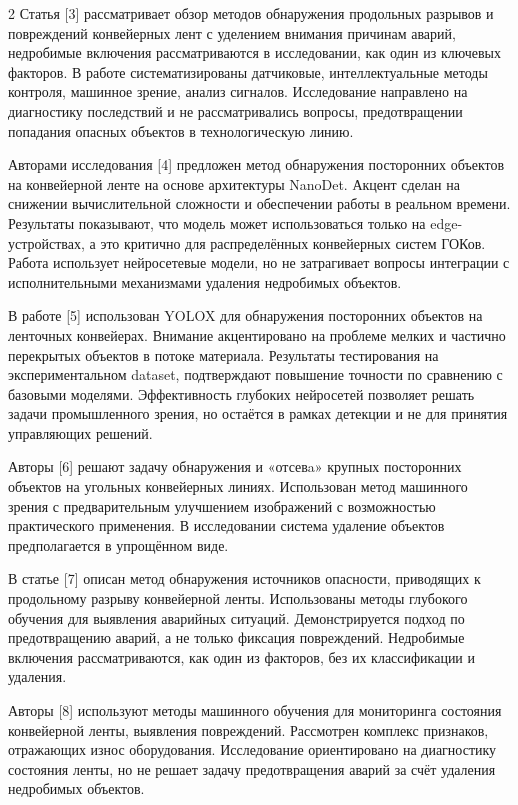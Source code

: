 \begin{multicols}{2}
Статья {[}3{]} рассматривает обзор методов обнаружения продольных
разрывов и повреждений конвейерных лент с уделением внимания причинам
аварий, недробимые включения рассматриваются в исследовании, как один из
ключевых факторов. В работе систематизированы датчиковые,
интеллектуальные методы контроля, машинное зрение, анализ сигналов.
Исследование направлено на диагностику последствий и не рассматривались
вопросы, предотвращении попадания опасных объектов в технологическую
линию.

Авторами исследования {[}4{]} предложен метод обнаружения посторонних
объектов на конвейерной ленте на основе архитектуры NanoDet. Акцент
сделан на снижении вычислительной сложности и обеспечении работы в
реальном времени. Результаты показывают, что модель может использоваться
только на edge-устройствах, а это критично для распределённых
конвейерных систем ГОКов. Работа использует нейросетевые модели, но не
затрагивает вопросы интеграции с исполнительными механизмами удаления
недробимых объектов.

В работе {[}5{]} использован YOLOX для обнаружения посторонних объектов
на ленточных конвейерах. Внимание акцентировано на проблеме мелких и
частично перекрытых объектов в потоке материала. Результаты тестирования
на экспериментальном dataset, подтверждают повышение точности по
сравнению с базовыми моделями. Эффективность глубоких нейросетей
позволяет решать задачи промышленного зрения, но остаётся в рамках
детекции и не для принятия управляющих решений.

Авторы {[}6{]} решают задачу обнаружения и «отсевa» крупных посторонних
объектов на угольных конвейерных линиях. Использован метод машинного
зрения с предварительным улучшением изображений с возможностью
практического применения. В исследовании система удаление объектов
предполагается в упрощённом виде.

В статье {[}7{]} описан метод обнаружения источников опасности,
приводящих к продольному разрыву конвейерной ленты. Использованы методы
глубокого обучения для выявления аварийных ситуаций. Демонстрируется
подход по предотвращению аварий, а не только фиксация повреждений.
Недробимые включения рассматриваются, как один из факторов, без их
классификации и удаления.

Авторы {[}8{]} используют методы машинного обучения для мониторинга
состояния конвейерной ленты, выявления повреждений. Рассмотрен комплекс
признаков, отражающих износ оборудования. Исследование ориентировано на
диагностику состояния ленты, но не решает задачу предотвращения аварий
за счёт удаления недробимых объектов.


\end{multicols}
